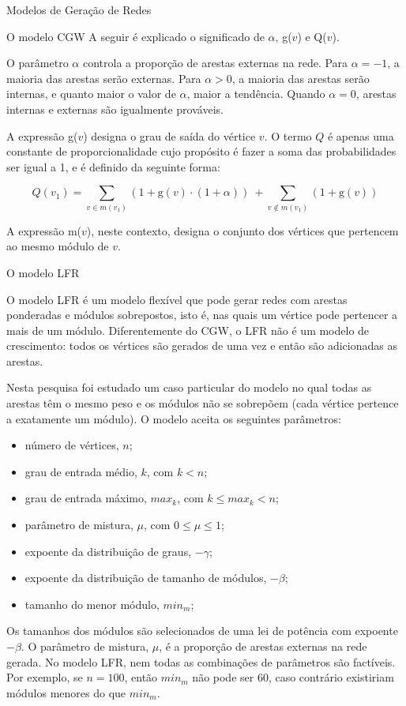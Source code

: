 \begin{section}{Modelos de Geração de Redes}
\begin{subsection}{O modelo CGW}
A seguir é explicado o significado de $\alpha$, g($v$) e Q($v$).

 O parâmetro $\alpha$ controla a proporção de arestas externas na rede. Para $\alpha = -1$, a maioria das arestas serão externas. Para $\alpha > 0$, a maioria das arestas serão internas, e quanto maior o valor de $\alpha$, maior a tendência. Quando $\alpha = 0$, arestas internas e externas são igualmente prováveis.

A expressão g($v$) designa o grau de saída do vértice $v$. O termo $Q$ é apenas uma constante de proporcionalidade cujo propósito é fazer a soma das probabilidades ser igual a 1, e é definido da seguinte forma:

$$
Q(v_1) = \sum_{v \in m(v_1)} (1 + \mathrm{g}(v) \cdot (1 + \alpha))
~+ \sum_{v \notin m(v_1)} (1 + \mathrm{g}(v))
$$

A expressão m($v$), neste contexto, designa o conjunto dos vértices que pertencem ao mesmo módulo de $v$.

\end{subsection}

\begin{subsection}{O modelo LFR}

O modelo LFR \cite{Lancichinetti2008,Lancichinetti2009} é um modelo flexível que pode gerar redes com arestas ponderadas e módulos sobrepostos, isto é, nas quais um vértice pode pertencer a mais de um módulo. Diferentemente do CGW, o LFR não é um modelo de crescimento: todos os vértices são gerados de uma vez e então são adicionadas as arestas.

Nesta pesquisa foi estudado um caso particular do modelo no qual todas as arestas têm o mesmo peso e os módulos não se sobrepõem (cada vértice pertence a exatamente um módulo). O modelo aceita os seguintes parâmetros:

\begin{itemize}
\item número de vértices, $n$;
\item grau de entrada médio, $k$, com $k < n$;
\item grau de entrada máximo, $max_k$, com $k \le max_k < n$;
\item parâmetro de mistura, $\mu$, com $0 \le \mu \le 1$;
\item expoente da distribuição de graus, $-\gamma$;
\item expoente da distribuição de tamanho de módulos, $-\beta$;
\item tamanho do menor módulo, $min_m$;
\end{itemize}

Os tamanhos dos módulos são selecionados de uma lei de potência com expoente $-\beta$. O parâmetro de mistura, $\mu$, é a proporção de arestas externas na rede gerada. No modelo LFR, nem todas as combinações de parâmetros são factíveis. Por exemplo, se $n = 100$, então $min_m$ não pode ser 60, caso contrário existiriam módulos menores do que $min_m$.

\end{subsection}

\end{section}

